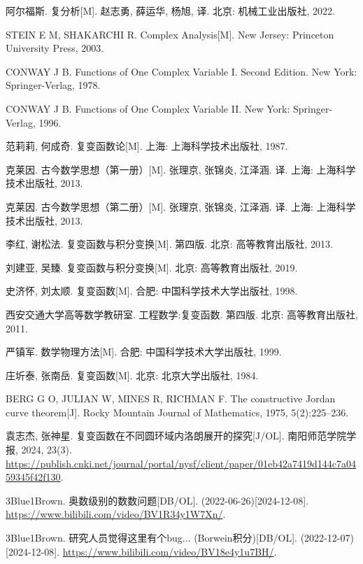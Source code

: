 \begin{thebibliography}{99}
	阿尔福斯.
	复分析[M].
	赵志勇, 薛运华, 杨旭, 译.
	北京: 机械工业出版社, 2022.

	STEIN E M, SHAKARCHI R.
	Complex Analysis[M].
	New Jersey: Princeton University Press, 2003.

	CONWAY J B.
	Functions of One Complex Variable I.
	Second Edition.
	New York: Springer-Verlag, 1978.

	CONWAY J B.
	Functions of One Complex Variable II.
	New York: Springer-Verlag, 1996.

	范莉莉, 何成奇.
	复变函数论[M].
	上海: 上海科学技术出版社, 1987.

	克莱因.
	古今数学思想（第一册）[M].
	张理京, 张锦炎, 江泽涵. 译.
	上海: 上海科学技术出版社, 2013.

	克莱因.
	古今数学思想（第二册）[M].
	张理京, 张锦炎, 江泽涵. 译.
	上海: 上海科学技术出版社, 2013.

	李红, 谢松法.
	复变函数与积分变换[M].
	第四版.
	北京: 高等教育出版社, 2013.

	刘建亚, 吴臻.
	复变函数与积分变换[M].
	北京: 高等教育出版社, 2019.
	
	史济怀, 刘太顺.
	复变函数[M].
	合肥: 中国科学技术大学出版社, 1998.
	
	西安交通大学高等数学教研室.
	工程数学:复变函数.
	第四版.
	北京: 高等教育出版社, 2011.

	严镇军.
	数学物理方法[M].
	合肥: 中国科学技术大学出版社, 1999.

	庄圻泰, 张南岳.
	复变函数[M].
	北京: 北京大学出版社, 1984.

	BERG G O, JULIAN W, MINES R, RICHMAN F.
	The constructive Jordan curve theorem[J].
	Rocky Mountain Journal of Mathematics, 1975, 5(2):225--236.

	袁志杰, 张神星.
	复变函数在不同圆环域内洛朗展开的探究[J/OL].
	南阳师范学院学报, 2024, 23(3).
	\url{https://publish.cnki.net/journal/portal/nysf/client/paper/01eb42a7419d144c7a0459345f42f130}.

	3Blue1Brown.
	奥数级别的数数问题[DB/OL].
	(2022-06-26)[2024-12-08].
	\url{https://www.bilibili.com/video/BV1R34y1W7Xn/}.

	3Blue1Brown.
	研究人员觉得这里有个bug... (Borwein积分)[DB/OL].
	(2022-12-07)[2024-12-08].
	\url{https://www.bilibili.com/video/BV18e4y1u7BH/}.


\end{thebibliography}
